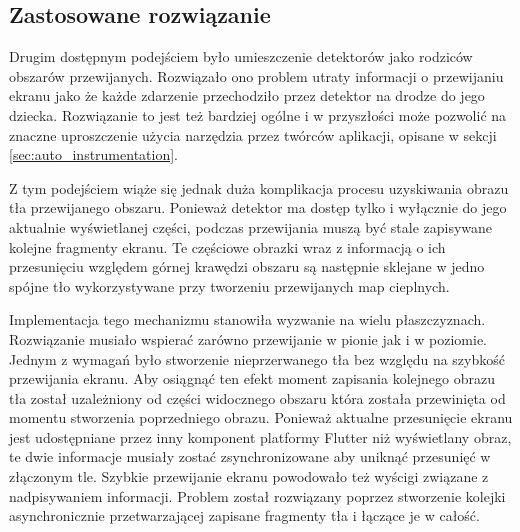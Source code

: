 \subsection{Zastosowane rozwiązanie}
Drugim dostępnym podejściem było umieszczenie detektorów jako rodziców obszarów przewijanych. Rozwiązało ono problem utraty informacji o przewijaniu ekranu jako że każde zdarzenie przechodziło przez detektor na drodze do jego dziecka. Rozwiązanie to jest też bardziej ogólne i w przyszłości może pozwolić na znaczne uproszczenie użycia narzędzia przez twórców aplikacji, opisane w sekcji \ref{sec:auto_instrumentation}. 

Z tym podejściem wiąże się jednak duża komplikacja procesu uzyskiwania obrazu tła przewijanego obszaru. Ponieważ detektor ma dostęp tylko i wyłącznie do jego aktualnie wyświetlanej części, podczas przewijania muszą być stale zapisywane kolejne fragmenty ekranu. Te częściowe obrazki wraz z informacją o ich przesunięciu względem górnej krawędzi obszaru są następnie sklejane w jedno spójne tło wykorzystywane przy tworzeniu przewijanych map cieplnych.

Implementacja tego mechanizmu stanowiła wyzwanie na wielu płaszczyznach. Rozwiązanie musiało wspierać zarówno przewijanie w pionie jak i w poziomie. Jednym z wymagań było stworzenie nieprzerwanego tła bez względu na szybkość przewijania ekranu. Aby osiągnąć ten efekt moment zapisania kolejnego obrazu tła został uzależniony od części widocznego obszaru która została przewinięta od momentu stworzenia poprzedniego obrazu. Ponieważ aktualne przesunięcie ekranu jest udostępniane przez inny komponent platformy Flutter niż wyświetlany obraz, te dwie informacje musiały zostać zsynchronizowane aby uniknąć przesunięć w złączonym tle. Szybkie przewijanie ekranu powodowało też wyścigi związane z nadpisywaniem informacji. Problem został rozwiązany poprzez stworzenie kolejki asynchronicznie przetwarzającej zapisane fragmenty tła i łączące je w całość.
